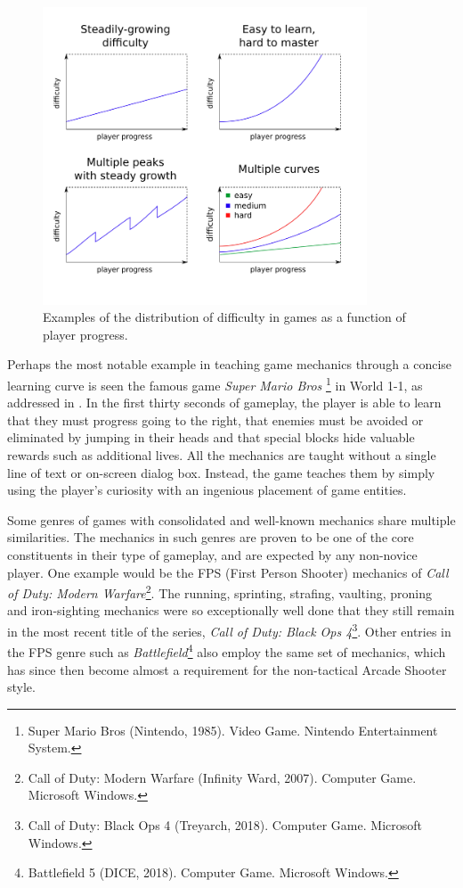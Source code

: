 \begin{figure}
    \caption{Examples of the distribution of difficulty in games as a function of player progress.}
    \begin{center}
        \includegraphics[width=26em]{figures/fig-difficulty-curves.png}
    \end{center}
    \label{fig:difficulty-curves}
\end{figure}

Perhaps the most notable example in teaching game mechanics through a concise learning curve is seen the famous game \emph{Super Mario Bros} \footnote{Super Mario Bros (Nintendo, 1985). Video Game. Nintendo Entertainment System.} in World 1-1, as addressed in \cite{video_extracreditsmario11}. In the first thirty seconds of gameplay, the player is able to learn that they must progress going to the right, that enemies must be avoided or eliminated by jumping in their heads and that special blocks hide valuable rewards such as additional lives. All the mechanics are taught without a single line of text or on-screen dialog box. Instead, the game teaches them by simply using the player's curiosity with an ingenious placement of game entities.

Some genres of games with consolidated and well-known mechanics share multiple similarities. The mechanics in such genres are proven to be one of the core constituents in their type of gameplay, and are expected by any non-novice player. One example would be the FPS (First Person Shooter) mechanics of \emph{Call of Duty: Modern Warfare}\footnote{Call of Duty: Modern Warfare (Infinity Ward, 2007). Computer Game. Microsoft Windows.}. The running, sprinting, strafing, vaulting, proning and iron-sighting mechanics were so exceptionally well done that they still remain in the most recent title of the series, \emph{Call of Duty: Black Ops 4}\footnote{Call of Duty: Black Ops 4 (Treyarch, 2018). Computer Game. Microsoft Windows.}. Other entries in the FPS genre such as \emph{Battlefield}\footnote{Battlefield 5 (DICE, 2018). Computer Game. Microsoft Windows.} also employ the same set of mechanics, which has since then become almost a requirement for the non-tactical Arcade Shooter style.

